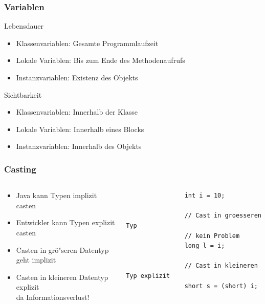 \begin{frame}
	\frametitle{Variablen}
	\begin{block}{Lebensdauer}
		\begin{itemize}
			 \item Klassenvariablen: Gesamte Programmlaufzeit
			 \item Lokale Variablen: Bis zum Ende des Methodenaufrufs
			 \item Instanzvariablen: Existenz des Objekts
		\end{itemize}
	\end{block}
	\begin{exampleblock}{Sichtbarkeit}
		\begin{itemize}
			 \item Klassenvariablen: Innerhalb der Klasse
			 \item Lokale Variablen: Innerhalb eines Blocks
			 \item Instanzvariablen: Innerhalb des Objekts
		\end{itemize}
	\end{exampleblock}
\end{frame} 

\begin{frame}[fragile]
	\frametitle{Casting}
	\begin{columns}
		\begin{column}{0.5\textwidth}
			\small
			\begin{itemize}
				\item Java kann Typen implizit casten
				\item Entwickler kann Typen explizit casten
				\item Casten in gr\"o"seren Datentyp geht implizit
				\item Casten in kleineren Datentyp explizit\\
						da Informationsverlust!
			\end{itemize}
		\end{column}
		\begin{column}{0.5\textwidth}
			\begin{lstlisting}
				int i = 10;
				
				// Cast in groesseren Typ 
				// kein Problem
				long l = i;
				
				// Cast in kleineren Typ explizit
				short s = (short) i;
			\end{lstlisting}
		\end{column}
	\end{columns}
\end{frame}
 

